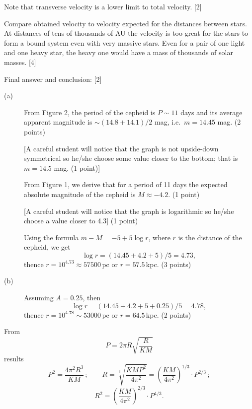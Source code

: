 Note that transverse velocity is a lower limit to total velocity. \hfill[2]

Compare obtained velocity to velocity expected for the distances between
stars. At distances of tens of thousands of AU the velocity is too great for
the stars to form a bound system even with very massive stars. Even for a
pair of one light and one heavy star, the heavy one would have a mass of
thousands of solar masses. \hfill[4]

Final answer and conclusion: \hfill[2]

\begin{description}
\item[(a)] From Figure 2, %
  the period of the cepheid is $P \sim 11$ days and
  its average apparent magnitude is $\sim(14.8 + 14.1)/2$ mag, i.e.\
  $m = 14.45$ mag. \hfill(2 points)

  [A careful student will notice that the graph is not upside-down symmetrical
  so he/she choose some value closer to the bottom; that is $m = 14.5$ mag.
  \hfill(1 point)]

  From Figure 1, %
  we derive that for a period of 11 days the expected absolute
  magnitude of the cepheid is $M \approx -4.2$. \hfill(1 point)

  [A careful student will notice that the graph is logarithmic so he/she
  choose a value closer to 4.3] \hfill(1 point)

  Using the formula $m - M = -5 + 5\log r$, where $r$ is the distance of the
  cepheid, we get
  \[ \log r = (14.45 + 4.2 + 5)/5 = 4.73, \]
  thence $r = 10^{4.73} \approx 57500$\,pc or $r = 57.5$\,kpc.
  \hfill(3 points)
\item[(b)] Assuming $A = 0.25$, then
  \[ \log r = (14.45 + 4.2 + 5 + 0.25)/5 = 4.78, \]
  thence $r = 10^{4.78} \sim 53000$\,pc or $r = 64.5$\,kpc.
  \hfill(2 points)
\end{description}

From
\[ P = 2\pi R\sqrt{\frac{R}{KM}} \]
results
\[ P^2 = \frac{4\pi^2 R^3}{KM}\,;\qquad
   R = \sqrt[3]{\frac{KMP^2}{4\pi^2}}
     = \left(\frac{KM}{4\pi^2}\right)^{1/3}\cdot P^{2/3}\,;
\]
\[ R^2 = \left(\frac{KM}{4\pi^2}\right)^{2/3}\cdot P^{4/3}. \]

